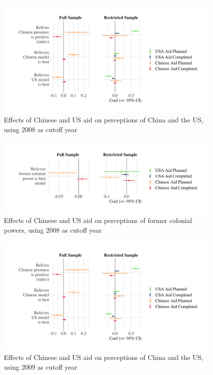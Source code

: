 \documentclass[9pt]{article}
\begin{document}
\begin{figure}[H]
\centering
\includegraphics[width=1\textwidth]{figures/figure_a4.png}
\caption{Effects of Chinese and US aid on perceptions of China and the US, using 2008 as cutoff year}
\end{figure}

\begin{figure}[H]
\centering
\includegraphics[width=1\textwidth]{figures/figure_a5.png}
\caption{Effects of Chinese and US aid on perceptions of former colonial powers, using 2008 as cutoff year}
\end{figure}

\begin{figure}[H]
\centering
\includegraphics[width=1\textwidth]{figures/figure_a6.png}
\caption{Effects of Chinese and US aid on perceptions of China and the US, using 2009 as cutoff year}
\end{figure}
\end{document}
